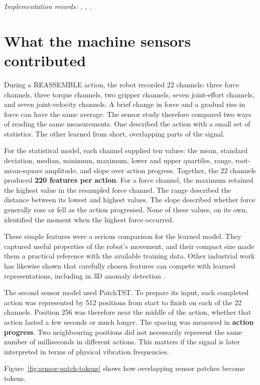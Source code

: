 \textit{Implementation records: , , .}

\section{What the machine sensors contributed}

During a REASSEMBLE action, the robot recorded 22 channels: three force channels, three torque channels, two gripper channels, seven joint-effort channels, and seven joint-velocity channels. A brief change in force and a gradual rise in force can have the same average. The sensor study therefore compared two ways of reading the same measurements. One described the action with a small set of statistics. The other learned from short, overlapping parts of the signal.

For the statistical model, each channel supplied ten values: the mean, standard deviation, median, minimum, maximum, lower and upper quartiles, range, root-mean-square amplitude, and slope over action progress. Together, the 22 channels produced \textbf{220 features per action}. For a force channel, the maximum retained the highest value in the resampled force channel. The range described the distance between its lowest and highest values. The slope described whether force generally rose or fell as the action progressed. None of these values, on its own, identified the moment when the highest force occurred.

These simple features were a serious comparison for the learned model. They captured useful properties of the robot’s movement, and their compact size made them a practical reference with the available training data. Other industrial work has likewise shown that carefully chosen features can compete with learned representations, including in 3D anomaly detection \parencite{Horwitz2023Back}.

The second sensor model used PatchTST. To prepare its input, each completed action was represented by 512 positions from start to finish on each of the 22 channels. Position 256 was therefore near the middle of the action, whether that action lasted a few seconds or much longer. The spacing was measured in \textbf{action progress}. Two neighbouring positions did not necessarily represent the same number of milliseconds in different actions. This matters if the signal is later interpreted in terms of physical vibration frequencies.

Figure~\ref{fig:sensor-patch-tokens} shows how overlapping sensor patches become tokens.


